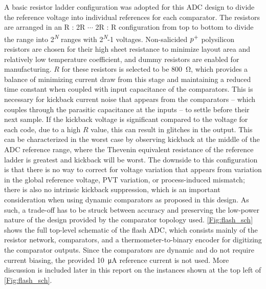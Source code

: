 \documentclass[11pt,letterpaper]{article}
\begin{document}
A basic resistor ladder configuration was adopted for this ADC design to divide the reference voltage into individual references for each comparator. The resistors are arranged in an R : 2R $\cdots$ 2R : R configuration from top to bottom to divide the range into 2\textsuperscript{\emph{N}} ranges with 2\textsuperscript{\emph{N}}-1 voltages. Non-salicided \(p\textsuperscript{+}\) polysilicon resistors are chosen for their high sheet resistance to minimize layout area and relatively low temperature coefficient, and dummy resistors are enabled for manufacturing. \(R\) for these resistors is selected to be \qty{800}{\ohm}, which provides a balance of minimizing current draw from this stage and maintaining a reduced time constant when coupled with input capacitance of the comparators. This is necessary for kickback current noise that appears from the comparators -- which couples through the parasitic capacitance at the inputs -- to settle before their next sample. If the kickback voltage is significant compared to the voltage for each code, due to a high \(R\) value, this can result in glitches in the output. This can be characterized in the worst case by observing kickback at the middle of the ADC reference range, where the Thevenin equivalent resistance of the reference ladder is greatest and kickback will be worst. The downside to this configuration is that there is no way to correct for voltage variation that appears from variation in the global reference voltage, PVT variation, or process-induced mismatch; there is also no intrinsic kickback suppression, which is an important consideration when using dynamic comparators as proposed in this design. As such, a trade-off has to be struck between accuracy and preserving the low-power nature of the design provided by the comparator topology used\@. \cref{Fig:flash_sch} shows the full top-level schematic of the flash ADC, which consists mainly of the resistor network, comparators, and a thermometer-to-binary encoder for digitizing the comparator outputs. Since the comparators are dynamic and do not require current biasing, the provided \qty{10}{\uA} reference current is not used. More discussion is included later in this report on the instances shown at the top left of \cref{Fig:flash_sch}.
\end{document}
